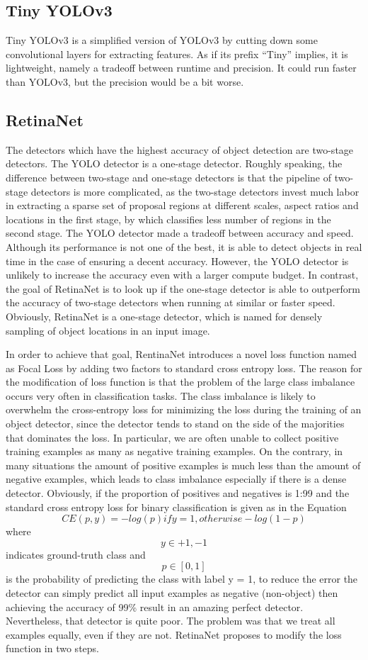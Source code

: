 \documentclass[runningheads]{llncs}
\begin{document}
\subsection{Tiny YOLOv3}
Tiny YOLOv3 is a simplified version of YOLOv3 by cutting down some convolutional layers for extracting features. As if its prefix “Tiny” implies, it is lightweight, namely a tradeoff between runtime and precision. It could run faster than YOLOv3, but the precision would be a bit worse. 

\subsection{RetinaNet}
The detectors which have the highest accuracy of object detection are two-stage detectors. The YOLO detector is a one-stage detector. Roughly speaking, the difference between two-stage and one-stage detectors is that the pipeline of two-stage detectors is more complicated, as the two-stage detectors invest much labor in extracting a sparse set of proposal regions at different scales, aspect ratios and locations in the first stage, by which classifies less number of regions in the second stage. The YOLO detector made a tradeoff between accuracy and speed. Although its performance is not one of the best, it is able to detect objects in real time in the case of ensuring a decent accuracy. However, the YOLO detector is unlikely to increase the accuracy even with a larger compute budget. In contrast, the goal of RetinaNet is to look up if the one-stage detector is able to outperform the accuracy of two-stage detectors when running at similar or faster speed. Obviously, RetinaNet is a one-stage detector, which is named for densely sampling of object locations in an input image. 

In order to achieve that goal, RentinaNet introduces a novel loss function named as Focal Loss by adding two factors to standard cross entropy loss. The reason for the modification of loss function is that the problem of the large class imbalance occurs very often in classification tasks. The class imbalance is likely to overwhelm the cross-entropy loss for minimizing the loss during the training of an object detector, since the detector tends to stand on the side of the majorities that dominates the loss. In particular, we are often unable to collect positive training examples as many as negative training examples. On the contrary, in many situations the amount of positive examples is much less than the amount of negative examples, which leads to class imbalance especially if there is a dense detector. Obviously, if the proportion of positives and negatives is 1:99 and the standard cross entropy loss for binary classification is given as in the Equation $$CE(p,y) = -log(p) if y =1, otherwise -log(1-p)$$ where $$y \in {+1, -1}$$ indicates ground-truth class and $$p \in [0,1]$$ is the probability of predicting the class with label y = 1, to reduce the error the detector can simply predict all input examples as negative (non-object) then achieving the accuracy of 99\% result in an amazing perfect detector. Nevertheless, that detector is quite poor. The problem was that we treat all examples equally, even if they are not. RetinaNet proposes to modify the loss function in two steps.
\end{document}
